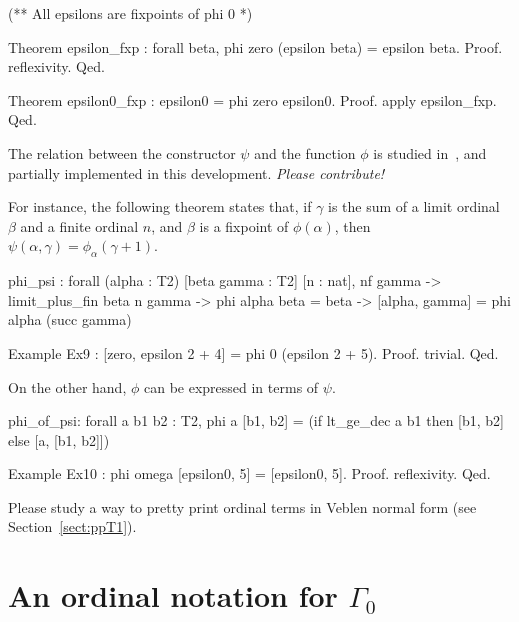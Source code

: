 {\begin{Coqsrc}
(**  All epsilons are fixpoints of phi 0 *)

Theorem epsilon_fxp : forall beta, phi zero (epsilon beta) =
                                   epsilon beta.
Proof. reflexivity. Qed.

Theorem epsilon0_fxp : epsilon0 = phi zero epsilon0.
Proof. apply epsilon_fxp. Qed.
\end{Coqsrc}


The relation between the constructor $\psi$ and the function $\phi$ is
studied in~\cite{schutte}, and partially implemented in this development.
\emph{Please contribute!}
 
For instance, the following theorem states that, if $\gamma$ is the sum of a limit ordinal $\beta$ and a finite ordinal $n$, and $\beta$ is a fixpoint of
$\phi(\alpha)$, then $\psi(\alpha,\gamma)=\phi_\alpha(\gamma+1)$.

\begin{Coqanswer}
phi_psi :
forall (alpha : T2) [beta gamma : T2] [n : nat],
nf gamma ->
limit_plus_fin beta n gamma ->
phi alpha beta = beta -> [alpha, gamma] = phi alpha (succ gamma)
\end{Coqanswer}

\begin{Coqsrc}
Example Ex9 : [zero, epsilon 2 + 4] = phi 0 (epsilon 2 + 5).
Proof. trivial. Qed.
\end{Coqsrc}

On the other hand, $\phi$ can be expressed in terms of $\psi$.

\begin{Coqanswer}
phi_of_psi:
  forall a b1 b2 : T2,
  phi a [b1, b2] = (if lt_ge_dec a b1 then [b1, b2] else [a, [b1, b2]])
\end{Coqanswer}

\begin{Coqsrc}
Example Ex10 : phi omega [epsilon0, 5] = [epsilon0, 5].
Proof. reflexivity. Qed.
\end{Coqsrc}

\begin{project}
Please study a way to pretty print ordinal terms in Veblen normal form (see Section~\vref{sect:ppT1}).
\end{project}

\section{An ordinal notation for \texorpdfstring{$\Gamma_0$}{\texttt{Gamma0}}}

}
